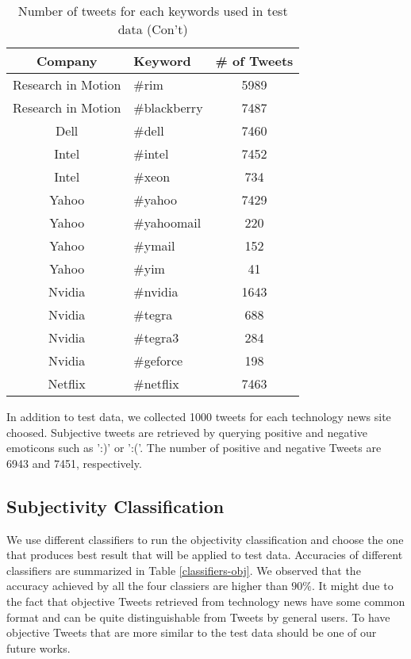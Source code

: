 \documentclass[12pt]{article}
\begin{document}
\begin{table}
\begin{center}
    \begin{tabular}{ | c || l | c | }
        \hline
        \textbf{Company} &  \textbf{Keyword} & \textbf{\# of Tweets} \\ \hline
        \hline
        Research in Motion &  \#rim & 5989 \\ \hline
        Research in Motion &  \#blackberry & 7487 \\ \hline
        Dell &  \#dell & 7460 \\ \hline
        Intel &  \#intel & 7452 \\ \hline
        Intel &  \#xeon & 734 \\ \hline
        Yahoo &  \#yahoo & 7429 \\ \hline
        Yahoo &  \#yahoomail & 220 \\ \hline
        Yahoo &  \#ymail & 152 \\ \hline
        Yahoo &  \#yim & 41 \\ \hline
        Nvidia &  \#nvidia & 1643 \\ \hline
        Nvidia &  \#tegra & 688 \\ \hline
        Nvidia &  \#tegra3 & 284 \\ \hline
        Nvidia &  \#geforce & 198 \\ \hline
        Netflix &  \#netflix & 7463 \\ \hline
        \hline
    \end{tabular}
\caption{Number of tweets for each keywords used in test data (Con't)}
\label{keywords-tweet-numbers-02}
\end{center}
\end{table}

In addition to test data, we collected 1000 tweets for each technology news site choosed. Subjective tweets are retrieved by querying positive and negative emoticons such as ':)' or ':('. The number of positive and negative Tweets are 6943 and 7451, respectively.

\subsection{Subjectivity Classification}
We use different classifiers to run the objectivity classification and choose the one that produces best result that will be applied to test data. Accuracies of different classifiers are summarized in Table \ref{classifiers-obj}. We observed that the accuracy achieved by all the four classiers are higher than $90\%$. It might due to the fact that objective Tweets retrieved from technology news have some common format and can be quite distinguishable from Tweets by general users. To have objective Tweets that are more similar to the test data should be one of our future works.
\end{document}
